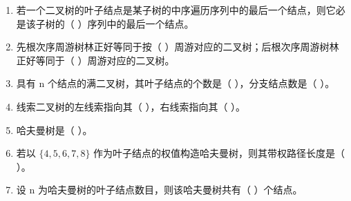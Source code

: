 \documentclass[12pt, a4paper]{article}
\begin{document}
\begin{enumerate}
    \item 若一个二叉树的叶子结点是某子树的中序遍历序列中的最后一个结点，则它必是该子树的（ ）序列中的最后一个结点。
    \item 先根次序周游树林正好等同于按（ ）周游对应的二叉树；后根次序周游树林正好等同于（ ）周游对应的二叉树。
    \item 具有 n 个结点的满二叉树，其叶子结点的个数是（ ），分支结点数是（ ）。
    \item 线索二叉树的左线索指向其（ ），右线索指向其（ ）。
    \item 哈夫曼树是（ ）。
    \item 若以 $\{4, 5, 6, 7, 8\}$ 作为叶子结点的权值构造哈夫曼树，则其带权路径长度是（ ）。
    \item 设 n 为哈夫曼树的叶子结点数目，则该哈夫曼树共有（ ）个结点。
\end{enumerate}
\end{document}
